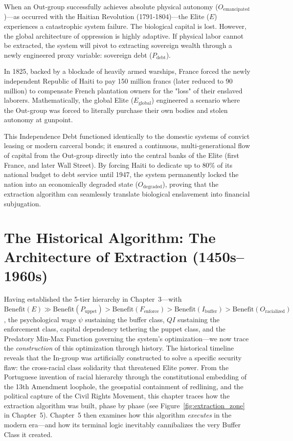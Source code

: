 \documentclass[12pt,openany]{book}
\begin{document}
When an Out-group successfully achieves absolute physical autonomy ($O_{\text{emancipated}}$)—as occurred with the Haitian Revolution (1791-1804)—the Elite ($E$) experiences a catastrophic system failure. The biological capital is lost. However, the global architecture of oppression is highly adaptive. If physical labor cannot be extracted, the system will pivot to extracting sovereign wealth through a newly engineered proxy variable: sovereign debt ($P_{\text{debt}}$).

In 1825, backed by a blockade of heavily armed warships, France forced the newly independent Republic of Haiti to pay 150 million francs (later reduced to 90 million) to compensate French plantation owners for the "loss" of their enslaved laborers. Mathematically, the global Elite ($E_{\text{global}}$) engineered a scenario where the Out-group was forced to literally purchase their own bodies and stolen autonomy at gunpoint.

This Independence Debt functioned identically to the domestic systems of convict leasing or modern carceral bonds; it ensured a continuous, multi-generational flow of capital from the Out-group directly into the central banks of the Elite (first France, and later Wall Street). By forcing Haiti to dedicate up to 80\% of its national budget to debt service until 1947, the system permanently locked the nation into an economically degraded state ($O_{\text{degraded}}$), proving that the extraction algorithm can seamlessly translate biological enslavement into financial subjugation.

\chapter{The Historical Algorithm: The Architecture of Extraction (1450s--1960s)}

Having established the 5-tier hierarchy in Chapter~3---with $\text{Benefit}(E) \gg \text{Benefit}(P_{\text{uppet}}) > \text{Benefit}(F_{\text{enforce}}) > \text{Benefit}(I_{\text{buffer}}) > \text{Benefit}(O_{\text{racialized}})$, the psychological wage $\psi$ sustaining the buffer class, $QI$ sustaining the enforcement class, capital dependency tethering the puppet class, and the Predatory Min-Max Function governing the system's optimization---we now trace the \textit{construction} of this optimization through history. The historical timeline reveals that the In-group was artificially constructed to solve a specific security flaw: the cross-racial class solidarity that threatened Elite power. From the Portuguese invention of racial hierarchy through the constitutional embedding of the 13th Amendment loophole, the geospatial containment of redlining, and the political capture of the Civil Rights Movement, this chapter traces how the extraction algorithm was built, phase by phase (see Figure~\ref{fig:extraction_zone} in Chapter~5). Chapter~5 then examines how this algorithm \textit{executes} in the modern era---and how its terminal logic inevitably cannibalizes the very Buffer Class it created.
\end{document}
